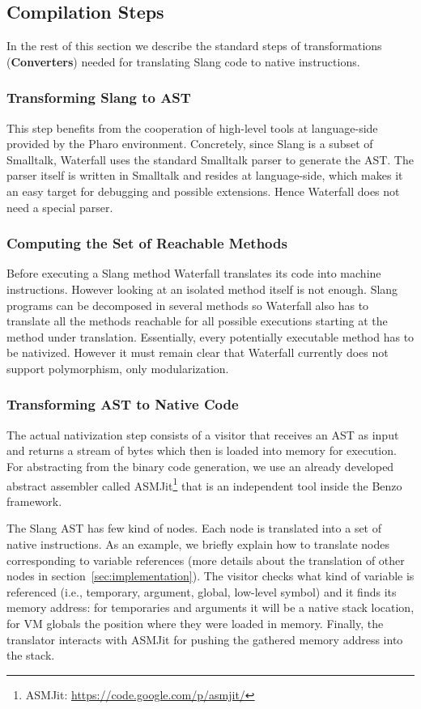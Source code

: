 \documentclass[10pt,preprint,letter]{sigplanconf}
\newcommand{\ST}  {Small\-talk\xspace}
\newcommand{\PH}  {Pharo\xspace}
\newcommand{\W}{Waterfall\xspace}
\newcommand{\B}{Benzo\xspace}
\begin{document}
\subsection{Compilation Steps}
In the rest of this section we describe the standard steps of transformations (\textbf{Converters}) needed for translating Slang code to native instructions.

\subsubsection{Transforming Slang to AST} 
This step benefits from the cooperation of high-level tools at language-side provided by the \PH environment.
Concretely, since Slang is a subset of \ST, \W uses the standard \ST parser to generate the AST.
The parser itself is written in \ST and resides at language-side, which makes it an easy target for debugging and possible extensions.
Hence \W does not need a special parser.

\subsubsection{Computing the Set of Reachable Methods}
Before executing a Slang method \W translates its code into machine instructions. 
However looking at an isolated method itself is not enough. 
Slang programs can be decomposed in several methods so  
\W also has to translate all the methods reachable for all possible executions starting at the method under translation. 
Essentially, every potentially executable method has to be nativized.
However it must remain clear that \W currently does not support polymorphism, only modularization.


\subsubsection{Transforming AST to Native Code}
The actual nativization step consists of a visitor that receives an AST as input and returns a stream of bytes which then is loaded into memory for execution.
For abstracting from the binary code generation, we use an already developed abstract assembler called ASMJit\footnote{ASMJit: \url{https://code.google.com/p/asmjit/}} that is an independent tool inside the \B framework.    

The Slang AST has few kind of nodes. Each node is translated into a set of native instructions.  
As an example, we briefly explain how to translate nodes corresponding to variable references (more details about the translation of other nodes in section~\ref{sec:implementation}).
The visitor checks what kind of variable is referenced (i.e., temporary, argument, global, low-level symbol)  and it finds its memory address: for temporaries and arguments it will be a native stack location, for VM globals the position where they were loaded in memory.
Finally, the translator interacts with ASMJit for pushing the gathered memory address into the stack.  
\end{document}
